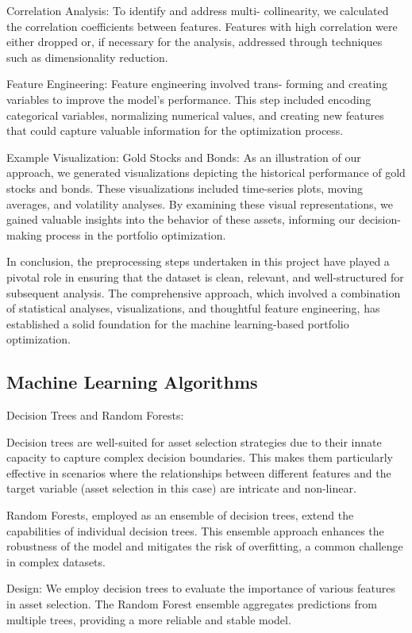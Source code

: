 \documentclass[conference]{IEEEtran}
\begin{document}
Correlation Analysis: To identify and address multi- collinearity, we calculated the correlation coefficients between features. Features with high correlation were either dropped or, if necessary for the analysis, addressed through techniques such as dimensionality reduction.

Feature Engineering: Feature engineering involved trans- forming and creating variables to improve the model’s performance. This step included encoding categorical variables, normalizing numerical values, and creating new features that could capture valuable information for the optimization process.

Example Visualization: Gold Stocks and Bonds: As an illustration of our approach, we generated visualizations depicting the historical performance of gold stocks and bonds. These visualizations included time-series plots, moving averages, and volatility analyses. By examining these visual representations, we gained valuable insights into the behavior of these assets, informing our decision-making process in the portfolio optimization.

In conclusion, the preprocessing steps undertaken in this project have played a pivotal role in ensuring that the dataset is clean, relevant, and well-structured for subsequent analysis. The comprehensive approach, which involved a combination of statistical analyses, visualizations, and thoughtful feature engineering, has established a solid foundation for the machine learning-based portfolio optimization.




\subsection{Machine Learning Algorithms}
Decision Trees and Random Forests:

Decision trees are well-suited for asset selection strategies due to their innate capacity to capture complex decision boundaries. This makes them particularly effective in scenarios where the relationships between different features and the target variable (asset selection in this case) are intricate and non-linear.

Random Forests, employed as an ensemble of decision trees, extend the capabilities of individual decision trees. This ensemble approach enhances the robustness of the model and mitigates the risk of overfitting, a common challenge in complex datasets.

Design: We employ decision trees to evaluate the importance of various features in asset selection. The Random Forest ensemble aggregates predictions from multiple trees, providing a more reliable and stable model.
\end{document}
